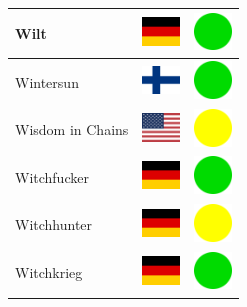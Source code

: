 \documentclass[12pt, a4paper, twoside]{report}
\begin{document}
\begin{center}
\begin{longtable}{|p{5cm}|p{2cm}|p{2cm}|}
 Wilt                                                       & \includegraphics[width=1cm]{../img/flags/de} &   \includegraphics[width=1cm]{../likes/y} \\ \hline
 Wintersun                                                  & \includegraphics[width=1cm]{../img/flags/fi} &   \includegraphics[width=1cm]{../likes/y} \\ \hline
 Wisdom in Chains                                           & \includegraphics[width=1cm]{../img/flags/us} &   \includegraphics[width=1cm]{../likes/m} \\ \hline
 Witchfucker                                                & \includegraphics[width=1cm]{../img/flags/de} &   \includegraphics[width=1cm]{../likes/y} \\ \hline
 Witchhunter                                                & \includegraphics[width=1cm]{../img/flags/de} &   \includegraphics[width=1cm]{../likes/m} \\ \hline
 Witchkrieg                                                 & \includegraphics[width=1cm]{../img/flags/de} &   \includegraphics[width=1cm]{../likes/y} \\ \hline

\end{longtable}
\end{center}
\end{document}
